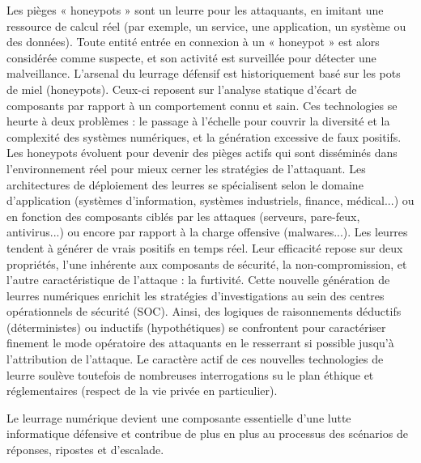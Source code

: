 Les pièges « honeypots » sont un leurre pour les attaquants, en imitant une ressource de calcul réel (par exemple, un service, une application, un système ou des données). Toute entité entrée en connexion à un « honeypot » est alors considérée comme suspecte, et son activité est surveillée pour détecter une malveillance.
L'arsenal du leurrage défensif est historiquement basé sur les pots de miel (honeypots). Ceux-ci reposent sur l'analyse statique d'écart de composants par rapport à un comportement connu et sain. Ces technologies se heurte à deux problèmes : le passage à l'échelle pour couvrir la diversité et la complexité des systèmes numériques, et la génération excessive de faux positifs. Les honeypots évoluent pour devenir des pièges actifs qui sont disséminés dans l'environnement réel pour mieux cerner les stratégies de l'attaquant. Les architectures de déploiement des leurres se spécialisent selon le domaine d'application (systèmes d'information, systèmes industriels, finance, médical...) ou en fonction des composants ciblés par les attaques (serveurs, pare-feux, antivirus...) ou encore par rapport à la charge offensive (malwares...). Les leurres tendent à générer de vrais positifs en temps réel. Leur efficacité repose sur deux propriétés, l'une inhérente aux composants de sécurité, la non-compromission, et l'autre caractéristique de l'attaque : la furtivité.  
Cette nouvelle génération de leurres numériques enrichit les stratégies d'investigations au sein des centres opérationnels de sécurité (SOC).  Ainsi, des logiques de raisonnements déductifs (déterministes) ou inductifs (hypothétiques) se confrontent pour caractériser finement le mode opératoire des attaquants en le resserrant si possible jusqu'à l'attribution de l'attaque. 
Le caractère actif de ces nouvelles technologies de leurre soulève toutefois de nombreuses  interrogations su le plan éthique et  réglementaires (respect de la vie privée en particulier).


Le leurrage numérique devient une composante essentielle d'une lutte informatique défensive et contribue de plus en plus au processus des scénarios de réponses, ripostes et d'escalade.

